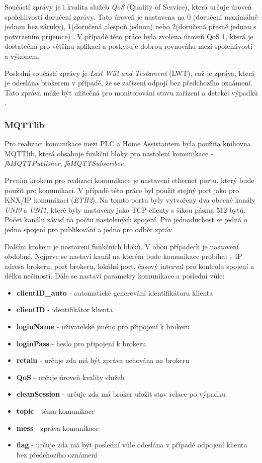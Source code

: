 \noindent Součástí zprávy je i kvalita služeb \textit{QoS} (Quality of Service), která určuje úroveň spolehlivosti doručení zprávy. Tato úroveň je nastavena na 0 (doručení maximálně jednou bez záruky), 1(doručená alespoň jednou) nebo 2(doručená přesně jednou s potvrzením příjemce) \cite{MQTTEsentials}. V případě této práce byla zvolena úroveň QoS 1, která je dostatečná pro většinu aplikací a poskytuje dobrou rovnováhu mezi spolehlivostí a výkonem. 

Poslední součástí zprávy je \textit{Last Will and Testament} (LWT), což je zpráva, která je odeslána brokerem v případě, že se zařízení odpojí bez předchozího oznámení. Tato zpráva může být užitečná pro monitorování stavu zařízení a detekci výpadků \cite{MQTTEssentials}.

\subsubsection{MQTTlib}
Pro realizaci komunikace mezi PLC a Home Assistantem byla použita knihovna MQTTlib, která obsahuje funkční bloky pro nastolení komunikace - \textit{fbMQTTPublisher}, \textit{fbMQTTSubscriber}. \cite{MQTTlib}

Prvním krokem pro realizaci komunikace je nastavení ethernet portu, který bude použit pro komunikaci. V případě této práce byl použit stejný port jako pro KNX/IP komunikaci (\textit{ETH2}). Na tomto portu byly vytvořeny dva obecné kanály \textit{UNI0} a \textit{UNI1}, které byly nastaveny jako TCP clienty s šíkou pásma 512 bytů. Počet kanálu závisí na počtu nastolených spojení. Pro jednoduchost se jedná o jedno spojení pro publikování a jedno pro odběr zpráv. 

Dalším krokem je nastavení funkčních bloků. V obou případech je nastavení obdobné. Nejprve se nastaví kanál na kterém bude komunikace probíhat - IP adresa brokeru, port brokeru, lokální port, časový interval pro kontrolu spojení a délku nečinosti. Dále se nastaví parametry komunikace a poslední vůle:
\begin{itemize}
    \item \textbf{clientID\_auto} - automatické generování identifikátoru klienta
    \item \textbf{clientID} - identifikátor klienta
    \item \textbf{loginName} - uživatelské jméno pro připojení k brokeru
    \item \textbf{loginPass} - heslo pro připojení k brokeru
    \item \textbf{retain} - určuje zda má být zpráva uchována na brokeru
    \item \textbf{QoS} - určuje úroveň kvality služeb
    \item \textbf{cleanSession} - určuje zda má broker uložit stav relace po výpadku
    \item \textbf{topic} - téma komunikace
    \item \textbf{mess} - zpráva komunikace
    \item \textbf{flag} - určuje zda má být poslední vůle odeslána v případě odpojení klienta bez předchozího oznámení \newline
\end{itemize}


